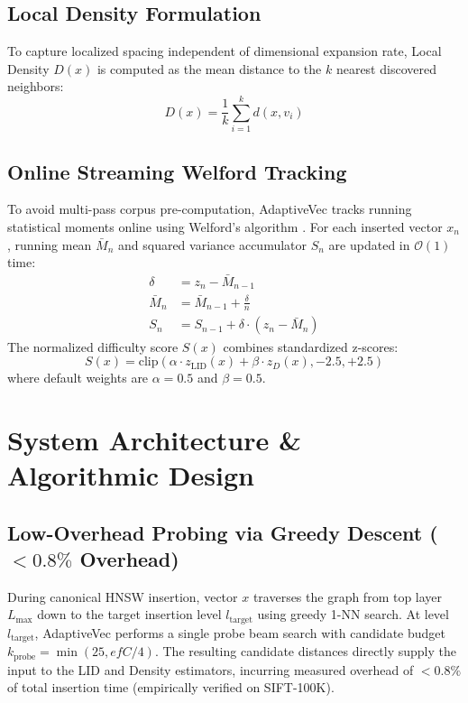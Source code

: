 \documentclass[conference,10pt]{IEEEtran}
\begin{document}
\subsection{Local Density Formulation}
To capture localized spacing independent of dimensional expansion rate, Local Density $D(x)$ is computed as the mean distance to the $k$ nearest discovered neighbors:
\begin{equation}
D(x) = \frac{1}{k} \sum_{i=1}^k d(x, v_i)
\end{equation}

\subsection{Online Streaming Welford Tracking}
To avoid multi-pass corpus pre-computation, AdaptiveVec tracks running statistical moments online using Welford's algorithm \cite{welford1962note}. For each inserted vector $x_n$, running mean $\bar{M}_n$ and squared variance accumulator $S_n$ are updated in $\mathcal{O}(1)$ time:
\begin{align}
\delta &= z_n - \bar{M}_{n-1} \\
\bar{M}_n &= \bar{M}_{n-1} + \frac{\delta}{n} \\
S_n &= S_{n-1} + \delta \cdot (z_n - \bar{M}_n)
\end{align}
The normalized difficulty score $S(x)$ combines standardized z-scores:
\begin{equation}
S(x) = \text{clip}\left( \alpha \cdot z_{\text{LID}}(x) + \beta \cdot z_D(x), -2.5, +2.5 \right)
\end{equation}
where default weights are $\alpha = 0.5$ and $\beta = 0.5$.

\section{System Architecture \& Algorithmic Design}

\subsection{Low-Overhead Probing via Greedy Descent ($<0.8\%$ Overhead)}
During canonical HNSW insertion, vector $x$ traverses the graph from top layer $L_{\text{max}}$ down to the target insertion level $l_{\text{target}}$ using greedy 1-NN search. At level $l_{\text{target}}$, AdaptiveVec performs a single probe beam search with candidate budget $k_{\text{probe}} = \min(25, efC / 4)$. The resulting candidate distances directly supply the input to the LID and Density estimators, incurring measured overhead of $<0.8\%$ of total insertion time (empirically verified on SIFT-100K).
\end{document}

